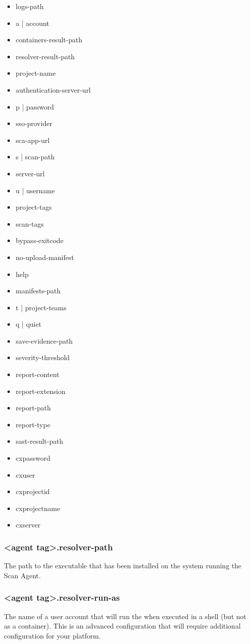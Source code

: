 \begin{itemize}
  \item logs-path
  \item a | account
  \item containers-result-path
  \item resolver-result-path
  \item project-name
  \item authentication-server-url
  \item p | password
  \item sso-provider
  \item sca-app-url
  \item s | scan-path
  \item server-url
  \item u | username
  \item project-tags
  \item scan-tags
  \item bypass-exitcode
  \item no-upload-manifest
  \item help
  \item manifests-path
  \item t | project-teams
  \item q | quiet
  \item save-evidence-path
  \item severity-threshold
  \item report-content
  \item report-extension
  \item report-path
  \item report-type
  \item sast-result-path
  \item cxpassword
  \item cxuser
  \item cxprojectid
  \item cxprojectname
  \item cxserver
\end{itemize}

\subsubsection{<agent tag>.resolver-path}\label{sec:agent-resolver-path}
The path to the \scaresolver executable that has been installed on the system running the Scan Agent.


\subsubsection{<agent tag>.resolver-run-as}\label{sec:agent-resolver-run-as}
The name of a user account that will run the \scaresolver when executed in a shell (but not as a container).  This
is an advanced configuration that will require additional configuration for your platform.  

